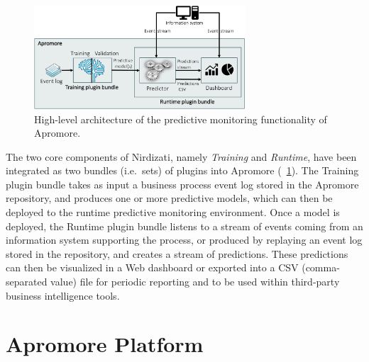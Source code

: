 \documentclass[runningheads,a4paper]{llncs}
\begin{document}
\begin{figure}[t]%
	\centering
	\includegraphics[width=0.7\textwidth]{img/nirdizati-overall.pdf}
	\caption{High-level architecture of the predictive monitoring functionality of Apromore.}
	\label{fig:nirdizati-overall}
\end{figure}

The two core components of Nirdizati, namely \textit{Training} and \textit{Runtime}, have been integrated as two bundles (i.e.\ sets) of plugins into Apromore (\figurename~\ref{fig:nirdizati-overall}). The Training plugin bundle takes as input a business process event log stored in the Apromore repository, and produces one or more predictive models, which can then be deployed to the runtime predictive monitoring environment. Once a model is deployed, the Runtime plugin bundle listens to a stream of events coming from an information system supporting the process, or produced by replaying an event log stored in the repository, and creates a stream of predictions. These predictions can then be visualized in a Web dashboard or exported into a CSV (comma-separated value) file for periodic reporting and to be used within third-party business intelligence tools.

\section{Apromore Platform}

\end{document}
